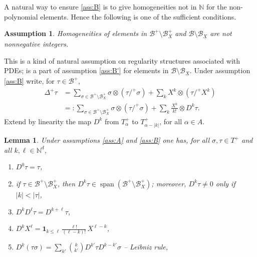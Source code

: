 \documentclass[JEP,XML,SOM,Unicode,published]{cedram}
\newenvironment{enumeratea}
{\bgroup\def\theenumi{\alph{enumi}}\begin{enumerate}}
{\end{enumerate}\egroup}
\DeclareMathOperator{\Span}{span}
\theoremstyle{plain}
\newtheorem{lem}[thm]{Lemma}
\newtheorem{assumption}{Assumption}
\renewcommand{\theassumption}{\Alph{assumption}}
\theoremstyle{definition}
\newcommand{\bbN}{\mathbb{N}}
\newcommand{\mcB}{\mathcal{B}}
\begin{document}
A natural way to ensure \eqref{ass:B} is to give homogeneities not in $\bbN$ for the non-polynomial elements.
Hence the following is one of the sufficient conditions.

\bgroup
\addtocounter{assumption}{-1}
\renewcommand{\theassumption}{\Alph{assumption}'}\begin{assumption}\label{ass:B'}
Homogeneities of elements in $\mcB^+\setminus\mcB_X^+$ and $\mcB\setminus\mcB_{\underline{X}}$ are not nonnegative integers.
\end{assumption}
\egroup

This is a kind of natural assumption on regularity structures associated with PDEs; \cite[Ass.\,5.3]{Hai} is a part of assumption \eqref{ass:B'} for elements in $\mcB\setminus\mcB_{\underline{X}}$. Under assumption \eqref{ass:B} write, for $\tau\in\mcB^+$,
\begin{equation}\label{def of D^ktau}
\begin{split}
\Delta^+\tau &= \sum_{\sigma\in\mcB^+\setminus\mcB_X^+}\sigma\otimes(\tau/^+\sigma) + \sum_{k}X^k\otimes(\tau/^+X^k) \\
&=: \sum_{\sigma\in\mcB^+\setminus\mcB_X^+}\sigma\otimes(\tau/^+\sigma) + \sum_{k}\frac{X^k}{k!}\otimes D^k\tau.
\end{split}
\end{equation}
Extend by linearity the map $D^k$ from $T_\alpha^+$ to $T_{\alpha-|k|}^+$, for all $\alpha\in A$.

\begin{lem}\label{lem:recursive rules}
Under assumptions \eqref{ass:A} and \eqref{ass:B} one has, for all $\sigma,\tau\in T^+$ and all $k,\ell\in\bbN^d$,
\begin{enumeratea}
	\item\label{lem:recursive rulesa} $D^0\tau = \tau$,
	
	\item\label{lem:recursive rulesb} if $\tau\!\in\!\mcB^+\!\setminus\!\mcB_X^+$, then $D^k\tau\!\in\!\Span (\mcB^+\!\setminus\!\mcB_X^+)$;
	moreover, $D^k\tau\!\neq\! 0$ only if $|k|\!<\!|\tau|$,
		
	\item\label{lem:recursive rulesc} $D^{k}D^\ell\tau = D^{k+\ell}\tau$,

	\item\label{lem:recursive rulesd} $D^{k}X^\ell = \mathbf{1}_{k\le \ell}\, \frac{\ell!}{(\ell-k)!} \, X^{\ell-k}$,
	
	\item\label{lem:recursive rulese} $D^k(\tau\sigma) = \sum_{k'} \binom{k}{k'} D^{k'}\tau D^{k-k'}\sigma$ -- {\sl Leibniz rule},
\end{enumeratea}
\end{lem}
\end{document}
